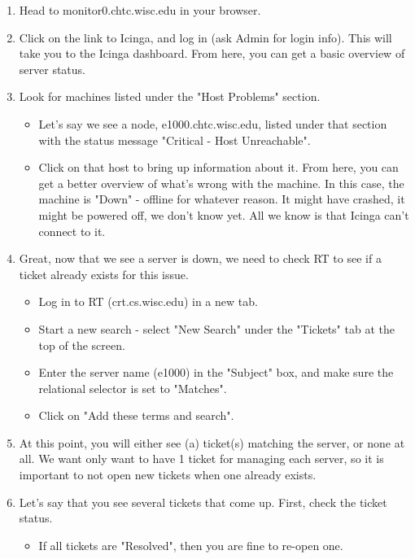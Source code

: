\documentclass[10pt,letterpaper]{article}
\begin{document}
    \begin{enumerate}
        \item Head to monitor0.chtc.wisc.edu in your browser.
        \item Click on the link to Icinga, and log in (ask Admin for login info).
        This will take you to the Icinga dashboard. From here, you can get a basic
        overview of server status.
        \item Look for machines listed under the "Host Problems" section.
        \begin{itemize}
            \item Let's say we see a node, e1000.chtc.wisc.edu, listed under that section
            with the status message "Critical - Host Unreachable".
            \item Click on that host to bring up information about it. From here,
            you can get a better overview of what's wrong with the machine. In this case,
            the machine is "Down" - offline for whatever reason. It might have crashed,
            it might be powered off, we don't know yet. All we know is that Icinga can't
            connect to it.
        \end{itemize}
        \item Great, now that we see a server is down, we need to check RT to see if
        a ticket already exists for this issue.
        \begin{itemize}
            \item Log in to RT (crt.cs.wisc.edu) in a new tab.
            \item Start a new search - select "New Search" under the "Tickets" tab
            at the top of the screen.
            \item Enter the server name (e1000) in the "Subject" box, and make sure
            the relational selector is set to "Matches".
            \item Click on "Add these terms and search".
        \end{itemize}
        \item At this point, you will either see (a) ticket(s) matching the server,
        or none at all. We want only want to have 1 ticket for managing each server, so
        it is important to not open new tickets when one already exists.
        \item Let's say that you see several tickets that come up. First, check the ticket
        status.
        \begin{itemize}
            \item If all tickets are "Resolved", then you are fine to re-open one.

\end{itemize}
\end{enumerate}
\end{document}
